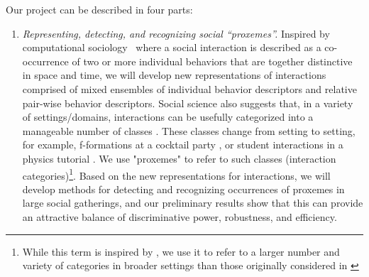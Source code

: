 Our project can be described in four parts:

\begin{enumerate}


\vspace{-0.1in}\item \emph{Representing, detecting, and recognizing social ``proxemes''.} Inspired by computational sociology~\cite{hall1974,Kendon1990,Lazer2009,Pantic} where a social interaction is described as a co-occurrence of two or more individual behaviors that are together distinctive in space and time, we will develop new representations of interactions comprised of mixed ensembles of individual behavior descriptors and relative pair-wise behavior descriptors.  Social science also suggests that, in a variety of settings/domains, interactions can be usefully categorized into a manageable number of classes \cite{hall1974,Kendon1990,Hoyle,Tannen,econo_category,Scherr2009}. These classes change from setting to setting, for example, f-formations at a cocktail party \cite{Kendon1990}, or student interactions in a physics tutorial \cite{Scherr2009}. We use "proxemes" to refer to such classes (interaction categories)\footnote{While this term is inspired by \cite{hall1974}, we use it to refer to a larger number and variety of categories in broader settings than those originally considered in \cite{hall1974}}. Based on the new representations for interactions, we will develop methods for detecting and recognizing occurrences of proxemes in large social gatherings, and our preliminary results show that this can provide an attractive balance of discriminative power, robustness, and efficiency.


\end{enumerate}
